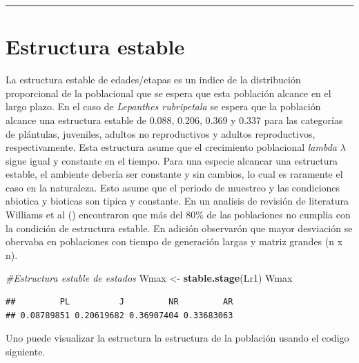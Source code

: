 \documentclass[
]{book}
\newenvironment{Shaded}{\begin{snugshade}}{\end{snugshade}}
\newcommand{\CommentTok}[1]{\textcolor[rgb]{0.56,0.35,0.01}{\textit{#1}}}
\newcommand{\FunctionTok}[1]{\textcolor[rgb]{0.13,0.29,0.53}{\textbf{#1}}}
\newcommand{\NormalTok}[1]{#1}
\newcommand{\OtherTok}[1]{\textcolor[rgb]{0.56,0.35,0.01}{#1}}
\theoremstyle{definition}
\theoremstyle{definition}
\theoremstyle{definition}
\theoremstyle{definition}
\theoremstyle{remark}
\begin{document}
\begin{center}\rule{0.5\linewidth}{0.5pt}\end{center}

\section{Estructura estable}\label{estructura-estable}

La estructura estable de edades/etapas es un indice de la distribución proporcional de la poblacional que se espera que esta población alcance en el largo plazo. En el caso de \emph{Lepanthes rubripetala} se espera que la población alcance una estructura estable de 0.088, 0.206, 0.369 y 0.337 para las categorías de plántulas, juveniles, adultos no reproductivos y adultos reproductivos, respectivamente. Esta estructura asume que el crecimiento poblacional \emph{lambda} \(\lambda\) sigue igual y constante en el tiempo. Para una especie alcancar una estructura estable, el ambiente debería ser constante y sin cambios, lo cual es raramente el caso en la naturaleza. Esto asume que el periodo de muestreo y las condiciones abiotica y bioticas son tipica y constante. En un analisis de revisión de literatura Williams et al (\citet{williams2011distance}) encontraron que más del 80\% de las poblaciones no cumplia con la condición de estructura estable. En adición observarón que mayor desviación se obervaba en poblaciones con tiempo de generación largas y matriz grandes (n x n).

\begin{Shaded}
\begin{Highlighting}[]
\CommentTok{\#Estructura estable de estados}
\NormalTok{Wmax }\OtherTok{\textless{}{-}} \FunctionTok{stable.stage}\NormalTok{(Lr1)}
\NormalTok{Wmax}
\end{Highlighting}
\end{Shaded}

\begin{verbatim}
##         PL          J         NR         AR 
## 0.08789851 0.20619682 0.36907404 0.33683063
\end{verbatim}

Uno puede visualizar la estructura la estructura de la población usando el codigo siguiente.
\end{document}
